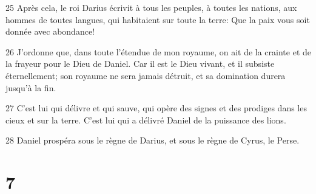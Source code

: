 \par 25 Après cela, le roi Darius écrivit à tous les peuples, à toutes les nations, aux hommes de toutes langues, qui habitaient sur toute la terre: Que la paix vous soit donnée avec abondance!
\par 26 J'ordonne que, dans toute l'étendue de mon royaume, on ait de la crainte et de la frayeur pour le Dieu de Daniel. Car il est le Dieu vivant, et il subsiste éternellement; son royaume ne sera jamais détruit, et sa domination durera jusqu'à la fin.
\par 27 C'est lui qui délivre et qui sauve, qui opère des signes et des prodiges dans les cieux et sur la terre. C'est lui qui a délivré Daniel de la puissance des lions.
\par 28 Daniel prospéra sous le règne de Darius, et sous le règne de Cyrus, le Perse.

\chapter{7}

